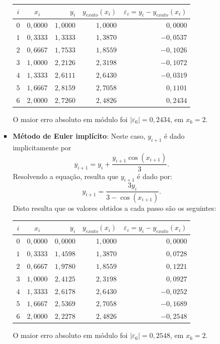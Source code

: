 \documentclass[12pt,a4paper]{article}
\begin{document}
\begin{enumerate}
\begin{enumerate}
\begin{itemize}
\medskip
\begin{center}
\begin{tabular}{ccrrr}
\hline
$i$ & $x_i$ & $y_i$ & $y_{exato}(x_i)$ & $\varepsilon_i = y_i-y_{exato}(x_i)$ \\ \hline
$0$ & $0,0000$ & $1,0000$ & $1,0000$ & $ 0,0000$ \\
$1$ & $0,3333$ & $1,3333$ & $1,3870$ & $-0,0537$ \\
$2$ & $0,6667$ & $1,7533$ & $1,8559$ & $-0,1026$ \\
$3$ & $1,0000$ & $2,2126$ & $2,3198$ & $-0,1072$ \\
$4$ & $1,3333$ & $2,6111$ & $2,6430$ & $-0,0319$ \\
$5$ & $1,6667$ & $2,8159$ & $2,7058$ & $ 0,1101$ \\
$6$ & $2,0000$ & $2,7260$ & $2,4826$ & $ 0,2434$ \\
\hline
\end{tabular}
\end{center}
\medskip
O maior erro absoluto em módulo foi $|\varepsilon_6| = 0,2434$, em $x_6 = 2$.

\item \textbf{Método de Euler implícito}:  Neste caso, $y_{i + 1}$ é dado implicitamente por
\[
y_{i + 1}
= y_{i} + \frac{y_{i + 1} \cos(x_{i + 1})}{3}.
\]
Resolvendo a equação, resulta que $y_{i + 1}$ é dado por:
\[
y_{i + 1}
= \frac{3 y_{i}}{3 - \cos(x_{i + 1})}.
\]
Disto resulta que os valores obtidos a cada passo são os seguintes:

\medskip
\begin{center}
\begin{tabular}{ccrrr}
\hline
$i$ & $x_i$ & $y_i$ & $y_{exato}(x_i)$ & $\varepsilon_i = y_i-y_{exato}(x_i)$ \\ \hline
$0$ & $0,0000$ & $0,0000$ & $1,0000$ & $ 0,0000$ \\
$1$ & $0,3333$ & $1,4598$ & $1,3870$ & $ 0,0728$ \\
$2$ & $0,6667$ & $1,9780$ & $1,8559$ & $ 0,1221$ \\
$3$ & $1,0000$ & $2,4125$ & $2,3198$ & $ 0,0927$ \\
$4$ & $1,3333$ & $2,6178$ & $2,6430$ & $-0,0252$ \\
$5$ & $1,6667$ & $2,5369$ & $2,7058$ & $-0,1689$ \\
$6$ & $2,0000$ & $2,2278$ & $2,4826$ & $-0,2548$ \\
\hline
\end{tabular}
\end{center}
\medskip
O maior erro absoluto em módulo foi $|\varepsilon_6| = 0,2548$, em $x_6 = 2$.


\end{itemize}
\end{enumerate}
\end{enumerate}
\end{document}
